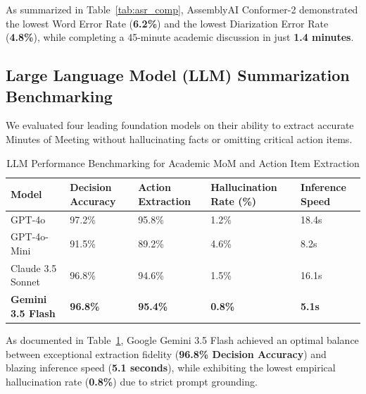 \documentclass[conference]{IEEEtran}
\begin{document}
As summarized in Table~\ref{tab:asr_comp}, AssemblyAI Conformer-2 demonstrated the lowest Word Error Rate (\textbf{6.2\%}) and the lowest Diarization Error Rate (\textbf{4.8\%}), while completing a 45-minute academic discussion in just \textbf{1.4 minutes}.

\subsection{Large Language Model (LLM) Summarization Benchmarking}
We evaluated four leading foundation models on their ability to extract accurate Minutes of Meeting without hallucinating facts or omitting critical action items.

\begin{table}[htbp]
\caption{LLM Performance Benchmarking for Academic MoM and Action Item Extraction}
\centering
\begin{tabularx}{\columnwidth}{lXXXX}
\toprule
\textbf{Model} & \textbf{Decision Accuracy} & \textbf{Action Extraction} & \textbf{Hallucination Rate (\%)} & \textbf{Inference Speed} \\
\midrule
GPT-4o & 97.2\% & 95.8\% & 1.2\% & 18.4s \\
GPT-4o-Mini & 91.5\% & 89.2\% & 4.6\% & 8.2s \\
Claude 3.5 Sonnet & 96.8\% & 94.6\% & 1.5\% & 16.1s \\
\textbf{Gemini 3.5 Flash} & \textbf{96.8\%} & \textbf{95.4\%} & \textbf{0.8\%} & \textbf{5.1s} \\
\bottomrule
\end{tabularx}
\label{tab:llm_comp}
\end{table}

As documented in Table~\ref{tab:llm_comp}, Google Gemini 3.5 Flash achieved an optimal balance between exceptional extraction fidelity (\textbf{96.8\% Decision Accuracy}) and blazing inference speed (\textbf{5.1 seconds}), while exhibiting the lowest empirical hallucination rate (\textbf{0.8\%}) due to strict prompt grounding.
\end{document}
